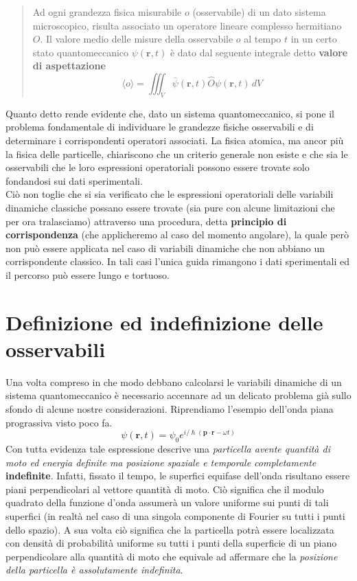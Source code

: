 \begin{quote}
    Ad ogni grandezza fisica misurabile \(o\) (osservabile) di un dato
    sistema microscopico, risulta associato un operatore lineare complesso
    hermitiano \(O\).
    Il valore medio delle misure della osservabile \(o\)
    al tempo \(t\) in un certo stato quantomeccanico \(\psi(\bm{r},t)\) è
    dato dal seguente integrale detto \textbf{valore di aspettazione}
    \begin{equation}
        \boxed{\langle o \rangle = \iiint_{V} \bar{\psi}(\bm{r},t)\hat{O}\psi(\bm{r},t) \, dV}
        \label{eq:observable-qm-axiom}
    \end{equation}
\end{quote}

Quanto detto rende evidente che, dato un sistema quantomeccanico, si
pone il problema fondamentale di individuare le grandezze fisiche
osservabili e di determinare i corrispondenti operatori associati.
La
fisica atomica, ma ancor più la fisica delle particelle, chiariscono che
un criterio generale non esiste e che sia le osservabili che le loro
espressioni operatoriali possono essere trovate solo fondandosi sui dati
sperimentali.\\
Ciò non toglie che si sia verificato che le espressioni operatoriali
delle variabili dinamiche classiche possano essere trovate (sia pure con
alcune limitazioni che per ora tralasciamo) attraverso una procedura,
detta \textbf{principio di corrispondenza} (che applicheremo al caso del
momento angolare), la quale però non può essere applicata nel caso di
variabili dinamiche che non abbiano un corrispondente classico.
In tali
casi l'unica guida rimangono i dati sperimentali ed il percorso può
essere lungo e tortuoso.

\section{Definizione ed indefinizione delle osservabili}
\label{sec:definizione-ed-indefinizione-delle-osservabili}

Una volta compreso in che modo debbano calcolarsi le variabili dinamiche
di un sistema quantomeccanico è necessario accennare ad un delicato
problema già sullo sfondo di alcune nostre considerazioni.
Riprendiamo
l'esempio dell'onda piana prograssiva visto poco fa. \[
                                                         \psi(\bm{r},t) = \psi_{0}e^{ i/\hslash (\bm{p}\cdot \bm{r}- \omega t)}
\] Con tutta evidenza tale espressione descrive una \emph{particella avente
quantità di moto ed energia definite ma posizione spaziale e temporale
completamente} \textbf{indefinite}.
Infatti, fissato il tempo, le
superfici equifase dell'onda risultano essere piani perpendicolari al
vettore quantità di moto.
Ciò significa che il modulo quadrato della
funzione d'onda assumerà un valore uniforme sui punti di tali superfici
(in realtà nel caso di una singola componente di Fourier su tutti i
punti dello spazio).
A sua volta ciò significa che la particella potrà
essere localizzata con densità di probabilità uniforme su tutti i punti
della superficie di un piano perpendicolare alla quantità di moto che
equivale ad affermare che la \emph{posizione della particella è assolutamente
indefinita}.

